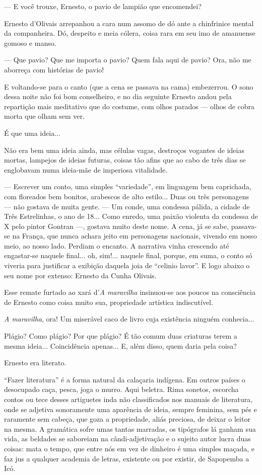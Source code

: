 --- E você trouxe, Ernesto, o pavio de lampião que encomendei?

Ernesto d'Olivais arrepanhou a cara num assomo de dó ante a chinfrinice
mental da companheira. Dó, despeito e meia cólera, coisa rara em seu imo
de amanuense gomoso e manso.

--- Que pavio? Que me importa o pavio? Quem fala aqui de pavio? Ora, não
me aborreça com histórias de pavio!

E voltando-se para o canto (que a cena se passava na cama) embezerrou. O
sono dessa noite não foi bom conselheiro, e no dia seguinte Ernesto
andou pela repartição mais meditativo que do costume, com olhos parados
--- olhos de cobra morta que olham sem ver.

É que uma ideia...

Não era bem uma ideia ainda, mas células vagas, destroços vogantes de
ideias mortas, lampejos de ideias futuras, coisas tão afins que ao cabo
de três dias se englobavam numa ideia-mãe de imperiosa vitalidade.

--- Escrever um conto, uma simples ``variedade'', em linguagem bem
caprichada, com floreados bem bonitos, arabescos de alto estilo... Duas
ou três personagens --- não gostava de muita gente. --- Um conde, uma
condessa pálida, a cidade de Três Estrelinhas, o ano de 18... Como
enredo, uma paixão violenta da condessa de X pelo pintor Gontran ---,
gostava muito deste nome. A cena, já se sabe, passava-se na França, que
nunca achara jeito em personagens nacionais, vivendo em nosso meio, ao
nosso lado. Perdiam o encanto. A narrativa vinha crescendo até
engastar-se naquele final... oh, sim!... naquele final, porque, em suma,
o conto só viveria para justificar a exibição daquela joia de ``celinio
lavor''. E logo abaixo o seu nome por extenso: Ernesto da Cunha Olivais.

Esse remate furtado ao xará d'\emph{A maravilha} insinuou-se aos poucos
na consciência de Ernesto como coisa muito sua, propriedade artística
indiscutível.

\emph{A maravilha}, ora! Um miserável caco de livro cuja existência
ninguém conhecia...

Plágio? Como plágio? Por que plágio? É tão comum duas criaturas terem a
mesma ideia... Coincidência apenas... E, além disso, quem daria pela
coisa?

Ernesto era literato.

``Fazer literatura'' é a forma natural da calaçaria indígena. Em outros
países o desocupado caça, pesca, joga o murro. Aqui beletra. Rima
sonetos, escorcha contos ou tece desses artiguetes inda não
classificados nos manuais de literatura, onde se adjetiva sonoramente
uma aparência de ideia, sempre feminina, sem pés e raramente sem cabeça,
que goza a propriedade, aliás preciosa, de deixar o leitor na mesma. A
gramática sofre umas tantas marradas, os tipógrafos lá ganham sua vida,
as beldades se saboreiam na cândi-adjetivação e o sujeito autor lucra
duas coisas: mata o tempo, que entre nós em vez de dinheiro é uma
simples maçada, e faz jus a qualquer academia de letras, existente ou
por existir, de Sapopemba a Icó.

